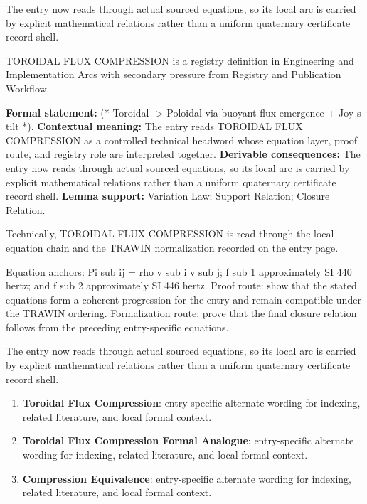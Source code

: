 The entry now reads through actual sourced equations, so its local arc is carried by explicit mathematical relations rather than a uniform quaternary certificate record shell.
\clearpage


\begingroup\small
{}
TOROIDAL FLUX COMPRESSION is a registry definition in Engineering and Implementation Arcs with secondary pressure from Registry and Publication Workflow.

\begingroup\footnotesize\setlength{\emergencystretch}{3em}\sloppy
\textbf{Formal statement:} (* Toroidal -> Poloidal via buoyant flux emergence + Joy s tilt *). \textbf{Contextual meaning:} The entry reads TOROIDAL FLUX COMPRESSION as a controlled technical headword whose equation layer, proof route, and registry role are interpreted together. \textbf{Derivable consequences:} The entry now reads through actual sourced equations, so its local arc is carried by explicit mathematical relations rather than a uniform quaternary certificate record shell. \textbf{Lemma support:} Variation Law; Support Relation; Closure Relation.\par
\endgroup

Technically, TOROIDAL FLUX COMPRESSION is read through the local equation chain and the TRAWIN normalization recorded on the entry page.

Equation anchors: Pi sub ij = rho v sub i v sub j; f sub 1 approximately SI 440 hertz; and f sub 2 approximately SI 446 hertz. Proof route: show that the stated equations form a coherent progression for the entry and remain compatible under the TRAWIN ordering. Formalization route: prove that the final closure relation follows from the preceding entry-specific equations.

The entry now reads through actual sourced equations, so its local arc is carried by explicit mathematical relations rather than a uniform quaternary certificate record shell.
\endgroup

\begin{enumerate}[leftmargin=1.6em,itemsep=6pt,topsep=4pt]
\item \textbf{Toroidal Flux Compression}: entry-specific alternate wording for indexing, related literature, and local formal context.
\item \textbf{Toroidal Flux Compression Formal Analogue}: entry-specific alternate wording for indexing, related literature, and local formal context.
\item \textbf{Compression Equivalence}: entry-specific alternate wording for indexing, related literature, and local formal context.
\end{enumerate}

